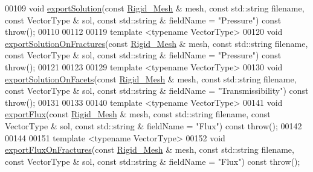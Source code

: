\begin{DoxyCode}
00109     \textcolor{keywordtype}{void} \hyperlink{classFVCode3D_1_1ExporterVTU_a476a1dd02bcba8c31f0d99c7106d0c21}{exportSolution}(\textcolor{keyword}{const} \hyperlink{classFVCode3D_1_1Rigid__Mesh}{Rigid\_Mesh} & mesh, \textcolor{keyword}{const} std::string filename, \textcolor{keyword}{const} 
      VectorType & sol, \textcolor{keyword}{const} std::string & fieldName = \textcolor{stringliteral}{"Pressure"}) \textcolor{keyword}{const} \textcolor{keywordflow}{throw}();
00110 
00112 
00119     \textcolor{keyword}{template} <\textcolor{keyword}{typename} VectorType>
00120     \textcolor{keywordtype}{void} \hyperlink{classFVCode3D_1_1ExporterVTU_abc88a5113c02b55942862ef39b30ec80}{exportSolutionOnFractures}(\textcolor{keyword}{const} \hyperlink{classFVCode3D_1_1Rigid__Mesh}{Rigid\_Mesh} & mesh, \textcolor{keyword}{const} 
      std::string filename, \textcolor{keyword}{const} VectorType & sol, \textcolor{keyword}{const} std::string & fieldName = \textcolor{stringliteral}{"Pressure"}) \textcolor{keyword}{const} \textcolor{keywordflow}{throw}();
00121 
00123 
00129     \textcolor{keyword}{template} <\textcolor{keyword}{typename} VectorType>
00130     \textcolor{keywordtype}{void} \hyperlink{classFVCode3D_1_1ExporterVTU_a3dd6650210988750d8c057f68a0f016d}{exportSolutionOnFacets}(\textcolor{keyword}{const} \hyperlink{classFVCode3D_1_1Rigid__Mesh}{Rigid\_Mesh} & mesh, \textcolor{keyword}{const} std::string 
      filename, \textcolor{keyword}{const} VectorType & sol, \textcolor{keyword}{const} std::string & fieldName = \textcolor{stringliteral}{"Transmissibility"}) \textcolor{keyword}{const} \textcolor{keywordflow}{throw}();
00131 
00133 
00140     \textcolor{keyword}{template} <\textcolor{keyword}{typename} VectorType>
00141     \textcolor{keywordtype}{void} \hyperlink{classFVCode3D_1_1ExporterVTU_a8e6ee7a5a2bede11d9671d37e78651a4}{exportFlux}(\textcolor{keyword}{const} \hyperlink{classFVCode3D_1_1Rigid__Mesh}{Rigid\_Mesh} & mesh, \textcolor{keyword}{const} std::string filename, \textcolor{keyword}{const} 
      VectorType & sol, \textcolor{keyword}{const} std::string & fieldName = \textcolor{stringliteral}{"Flux"}) \textcolor{keyword}{const} \textcolor{keywordflow}{throw}();
00142 
00144 
00151     \textcolor{keyword}{template} <\textcolor{keyword}{typename} VectorType>
00152     \textcolor{keywordtype}{void} \hyperlink{classFVCode3D_1_1ExporterVTU_a1bca940b11053faa1a928bf3b19709af}{exportFluxOnFractures}(\textcolor{keyword}{const} \hyperlink{classFVCode3D_1_1Rigid__Mesh}{Rigid\_Mesh} & mesh, \textcolor{keyword}{const} std::string 
      filename, \textcolor{keyword}{const} VectorType & sol, \textcolor{keyword}{const} std::string & fieldName = \textcolor{stringliteral}{"Flux"}) \textcolor{keyword}{const} \textcolor{keywordflow}{throw}();

\end{DoxyCode}
